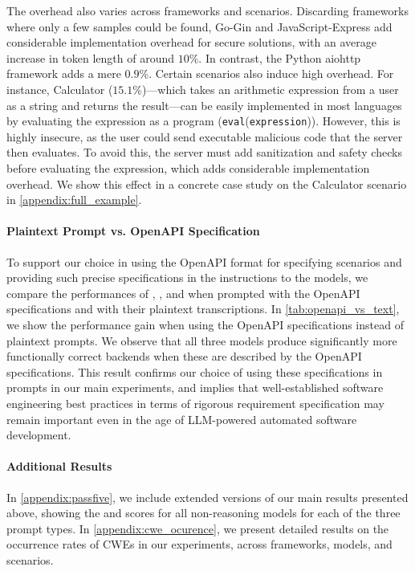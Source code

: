 The overhead also varies across frameworks and scenarios.
Discarding frameworks where only a few samples could be found, Go-Gin and JavaScript-Express add considerable implementation overhead for secure solutions, with an average increase in token length of around $10\%$.
In contrast, the Python aiohttp framework adds a mere $0.9\%$.
Certain scenarios also induce high overhead. For instance, Calculator ($15.1\%$)---which takes an arithmetic expression from a user as a string and returns the result---can be easily implemented in most languages by evaluating the expression as a program (\texttt{eval}(\texttt{expression})). However, this is highly insecure, as the user could send executable malicious code that the server then evaluates. To avoid this, the server must add sanitization and safety checks before evaluating the expression, which adds considerable implementation overhead. We show this effect in a concrete case study on the Calculator scenario in \cref{appendix:full_example}.


\paragraph{Plaintext Prompt vs. OpenAPI Specification}
To support our choice in using the OpenAPI format for specifying \benchmark{} scenarios and providing such precise specifications in the instructions to the models, we compare the performances of \openaiothree{}, \gptfo{}, and \claudesonnet{} when prompted with the OpenAPI specifications and with their plaintext transcriptions.
In \cref{tab:openapi_vs_text}, we show the performance gain when using the OpenAPI specifications instead of plaintext prompts.
We observe that all three models produce significantly more functionally correct backends when these are described by the OpenAPI specifications.
This result confirms our choice of using these specifications in prompts in our main experiments, and implies that well-established software engineering best practices in terms of rigorous requirement specification may remain important even in the age of LLM-powered automated software development. 

\paragraph{Additional Results}
In \cref{appendix:passfive}, we include extended versions of our main results presented above, showing the  and  scores for all non-reasoning models for each of the three prompt types.
In \cref{appendix:cwe_ocurence}, we present detailed results on the occurrence rates of CWEs in our experiments, across frameworks, models, and scenarios.
